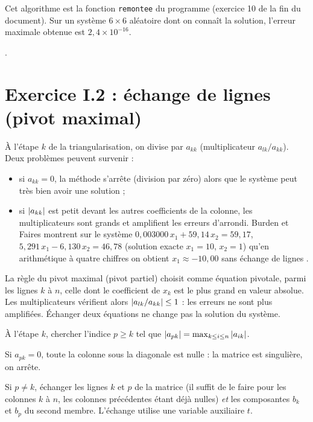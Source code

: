 \Verif Cet algorithme est la fonction \texttt{remontee} du programme
 (exercice 10 de la fin du document). Sur un système
$6\times 6$ aléatoire dont on connaît la solution, l'erreur maximale obtenue est
$2{,}4\times 10^{-16}$.

\Refs {}.

\section{Exercice I.2 : échange de lignes (pivot maximal)}


\Pourquoi À l'étape $k$ de la triangularisation, on divise par $a_{kk}$
(multiplicateur $a_{lk}/a_{kk}$). Deux problèmes peuvent survenir :
\begin{itemize}
  \item si $a_{kk} = 0$, la méthode s'arrête (division par zéro) alors que le
        système peut très bien avoir une solution ;
  \item si $\left|a_{kk}\right|$ est petit devant les autres coefficients de la
        colonne, les multiplicateurs sont grands et amplifient les erreurs
        d'arrondi. Burden et Faires montrent sur le système
        $0{,}003000\,x_1 + 59{,}14\,x_2 = 59{,}17$,
        $5{,}291\,x_1 - 6{,}130\,x_2 = 46{,}78$ (solution exacte $x_1 = 10$,
        $x_2 = 1$) qu'en arithmétique à quatre chiffres on obtient
        $x_1 \approx -10{,}00$ sans échange de lignes .
\end{itemize}
La règle du pivot maximal (pivot partiel) choisit comme équation pivotale,
parmi les lignes $k$ à $n$, celle dont le coefficient de $x_k$ est le plus
grand en valeur absolue. Les multiplicateurs vérifient alors
$\left|a_{lk}/a_{kk}\right| \le 1$ : les erreurs ne sont plus amplifiées. Échanger deux
équations ne change pas la solution du système.

\Etapes
{} À l'étape $k$, chercher l'indice $p \ge k$ tel que
$\left|a_{pk}\right| = \max_{k \le i \le n}\left|a_{ik}\right|$.

 Si $a_{pk} = 0$, toute la colonne sous la diagonale est nulle : la
matrice est singulière, on arrête.

 Si $p \neq k$, échanger les lignes $k$ et $p$ de la matrice (il suffit
de le faire pour les colonnes $k$ à $n$, les colonnes précédentes étant déjà
nulles) \emph{et} les composantes $b_k$ et $b_p$ du second membre. L'échange
utilise une variable auxiliaire $t$.

